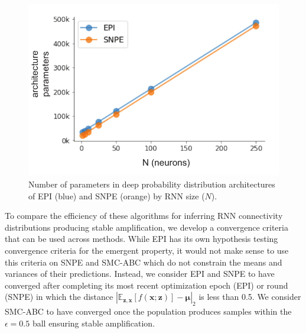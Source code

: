 \documentclass[11pt]{article}
\begin{document}
\begin{figure}
\begin{center}
\includegraphics[scale=0.7]{figures/figRNN1/figRNN1.pdf}
\end{center}
\caption{Number of parameters in deep probability distribution architectures of EPI (blue) and SNPE (orange) by RNN size ($N$).
}
\label{fig:RNN1}
\end{figure}

To compare the efficiency of these algorithms for inferring RNN connectivity distributions producing stable amplification, we develop a convergence criteria that can be used across methods.
While EPI has its own hypothesis testing convergence criteria for the emergent property, it would not make sense to use this criteria on SNPE and SMC-ABC which do not constrain the means and variances of their predictions.
Instead, we consider EPI and SNPE to have converged after completing its most recent optimization epoch (EPI) or round (SNPE) in which the distance $|\mathbb{E}_{\mathbf{z}, \mathbf{x}} \left[f(\mathbf{x}; \mathbf{z}) \right] - \bm{\mu}|_2$ is less than 0.5.
We consider SMC-ABC to have converged once the population produces samples within the $\epsilon = 0.5$ ball ensuring stable amplification.
\end{document}
